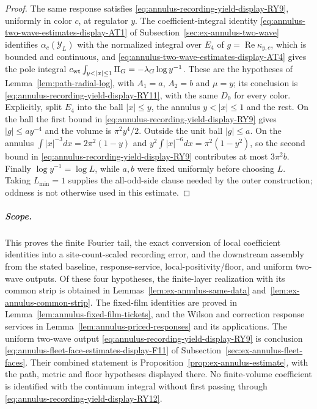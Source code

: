 \begin{proof}
The same response satisfies \eqref{eq:annulus-recording-yield-display-RY9}, uniformly in color $c$, at regulator
$y$. The coefficient-integral identity \eqref{eq:annulus-two-wave-estimates-display-AT1} of
Subsection~\ref{sec:ex-annulus-two-wave} identifies
$\alpha_c(\mathcal Y_L)$ with the normalized integral over $E_4$ of
$g=\operatorname{Re}\kappa_{y,c}$, which is bounded and continuous, and
\eqref{eq:annulus-two-wave-estimates-display-AT4} gives the pole integral
$c_{\rm wt}\int_{y<|x|\leq1}\Pi_G=-\lambda_G\log y^{-1}$. These are the
hypotheses of Lemma~\ref{lem:path-radial-log}, with $A_1=a$, $A_2=b$
and $\mu=y$; its conclusion is \eqref{eq:annulus-recording-yield-display-RY11}, with the same $D_0$ for every
color. Explicitly, split $E_4$ into the ball $|x|\leq y$, the annulus
$y<|x|\leq1$ and the rest. On the ball the first bound in \eqref{eq:annulus-recording-yield-display-RY9} gives
$|g|\leq ay^{-4}$ and the volume is $\pi^2y^4/2$. Outside the unit ball
$|g|\leq a$. On the annulus
$\int|x|^{-3}dx=2\pi^2(1-y)$ and
$y^2\int|x|^{-6}dx=\pi^2(1-y^2)$, so the second bound in \eqref{eq:annulus-recording-yield-display-RY9}
contributes at most $3\pi^2b$. Finally $\log y^{-1}=\log L$, while
$a,b$ were fixed uniformly before choosing $L$. Taking $L_{\min}=1$ supplies the all-odd-side clause needed by the
outer construction; oddness is not otherwise used in this estimate.
\end{proof}

\subparagraph{Scope.}
This proves the finite Fourier tail, the exact conversion of local
coefficient identities into a site-count-scaled recording error, and the
downstream assembly from the stated baseline, response-service,
local-positivity/floor, and uniform two-wave outputs. Of these four
hypotheses, the finite-layer realization with its common strip is
obtained in Lemmas~\ref{lem:ex-annulus-same-data}
and~\ref{lem:ex-annulus-common-strip}. The fixed-film identities are
proved in Lemma~\ref{lem:annulus-fixed-film-tickets}, and the Wilson
and correction response services in Lemma~\ref{lem:annulus-priced-responses}
and its applications. The uniform two-wave output \eqref{eq:annulus-recording-yield-display-RY9} is conclusion
\eqref{eq:annulus-fleet-face-estimates-display-F11} of Subsection~\ref{sec:ex-annulus-fleet-faces}. Their combined
statement is Proposition~\ref{prop:ex-annulus-estimate}, with the path,
metric and floor hypotheses displayed there. No
finite-volume coefficient is identified with the continuum integral
without first passing through \eqref{eq:annulus-recording-yield-display-RY12}.
